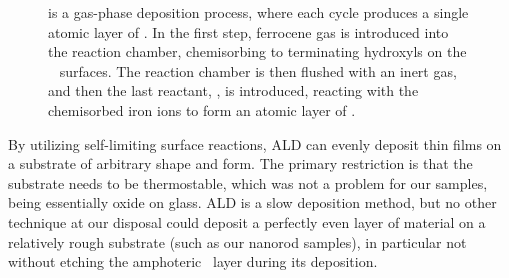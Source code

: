 \documentclass[draft,webedition,openright,titles,swedish,english]{LuaUUThesis}\usepackage[]{graphicx}\usepackage[]{xcolor}
\begin{document}
\begin{figure}[tbp]
\centering
{}
\caption[Sketch of the atomic-layer deposition process]{%
   \protect{} is a gas-phase deposition process, where each cycle produces
   a single atomic layer of \ironox.
   In the first step, ferrocene gas is introduced into the reaction chamber, chemisorbing
   to terminating hydroxyls on the \ZnO\ \protect{} surfaces. The reaction
   chamber is then flushed with an inert gas, and then the last reactant, ,
   is introduced, reacting with the chemisorbed iron ions to form an atomic layer of \ironox.
}
\label{fig:ALD-ferrocene-process}
\end{figure}

By utilizing self-limiting surface reactions, \gls{ALD} can evenly deposit
thin films on a substrate of arbitrary shape and form.
The primary restriction is that the substrate needs to be thermostable, which was
not a problem for our samples, being essentially oxide on glass.
\Gls{ALD} is a slow deposition method, but no other technique at
our disposal could deposit a perfectly even layer
of material on a relatively rough substrate (such as our  nanorod samples),
in particular not without etching the amphoteric \zincox\ layer during
its deposition.
\end{document}
